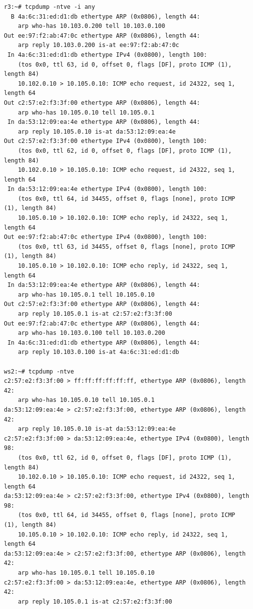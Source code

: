 \documentclass[a4paper,12pt]{article}
\begin{document}
\begin{Verbatim}
r3:~# tcpdump -ntve -i any
  B 4a:6c:31:ed:d1:db ethertype ARP (0x0806), length 44:
    arp who-has 10.103.0.200 tell 10.103.0.100
Out ee:97:f2:ab:47:0c ethertype ARP (0x0806), length 44:
    arp reply 10.103.0.200 is-at ee:97:f2:ab:47:0c
 In 4a:6c:31:ed:d1:db ethertype IPv4 (0x0800), length 100:
    (tos 0x0, ttl 63, id 0, offset 0, flags [DF], proto ICMP (1), length 84)
    10.102.0.10 > 10.105.0.10: ICMP echo request, id 24322, seq 1, length 64
Out c2:57:e2:f3:3f:00 ethertype ARP (0x0806), length 44:
    arp who-has 10.105.0.10 tell 10.105.0.1
 In da:53:12:09:ea:4e ethertype ARP (0x0806), length 44:
    arp reply 10.105.0.10 is-at da:53:12:09:ea:4e
Out c2:57:e2:f3:3f:00 ethertype IPv4 (0x0800), length 100:
    (tos 0x0, ttl 62, id 0, offset 0, flags [DF], proto ICMP (1), length 84)
    10.102.0.10 > 10.105.0.10: ICMP echo request, id 24322, seq 1, length 64
 In da:53:12:09:ea:4e ethertype IPv4 (0x0800), length 100:
    (tos 0x0, ttl 64, id 34455, offset 0, flags [none], proto ICMP (1), length 84)
    10.105.0.10 > 10.102.0.10: ICMP echo reply, id 24322, seq 1, length 64
Out ee:97:f2:ab:47:0c ethertype IPv4 (0x0800), length 100:
    (tos 0x0, ttl 63, id 34455, offset 0, flags [none], proto ICMP (1), length 84)
    10.105.0.10 > 10.102.0.10: ICMP echo reply, id 24322, seq 1, length 64
 In da:53:12:09:ea:4e ethertype ARP (0x0806), length 44:
    arp who-has 10.105.0.1 tell 10.105.0.10
Out c2:57:e2:f3:3f:00 ethertype ARP (0x0806), length 44:
    arp reply 10.105.0.1 is-at c2:57:e2:f3:3f:00
Out ee:97:f2:ab:47:0c ethertype ARP (0x0806), length 44:
    arp who-has 10.103.0.100 tell 10.103.0.200
 In 4a:6c:31:ed:d1:db ethertype ARP (0x0806), length 44:
    arp reply 10.103.0.100 is-at 4a:6c:31:ed:d1:db

ws2:~# tcpdump -ntve
c2:57:e2:f3:3f:00 > ff:ff:ff:ff:ff:ff, ethertype ARP (0x0806), length 42:
    arp who-has 10.105.0.10 tell 10.105.0.1
da:53:12:09:ea:4e > c2:57:e2:f3:3f:00, ethertype ARP (0x0806), length 42:
    arp reply 10.105.0.10 is-at da:53:12:09:ea:4e
c2:57:e2:f3:3f:00 > da:53:12:09:ea:4e, ethertype IPv4 (0x0800), length 98:
    (tos 0x0, ttl 62, id 0, offset 0, flags [DF], proto ICMP (1), length 84)
    10.102.0.10 > 10.105.0.10: ICMP echo request, id 24322, seq 1, length 64
da:53:12:09:ea:4e > c2:57:e2:f3:3f:00, ethertype IPv4 (0x0800), length 98:
    (tos 0x0, ttl 64, id 34455, offset 0, flags [none], proto ICMP (1), length 84)
    10.105.0.10 > 10.102.0.10: ICMP echo reply, id 24322, seq 1, length 64
da:53:12:09:ea:4e > c2:57:e2:f3:3f:00, ethertype ARP (0x0806), length 42:
    arp who-has 10.105.0.1 tell 10.105.0.10
c2:57:e2:f3:3f:00 > da:53:12:09:ea:4e, ethertype ARP (0x0806), length 42:
    arp reply 10.105.0.1 is-at c2:57:e2:f3:3f:00
\end{Verbatim}
\end{document}

